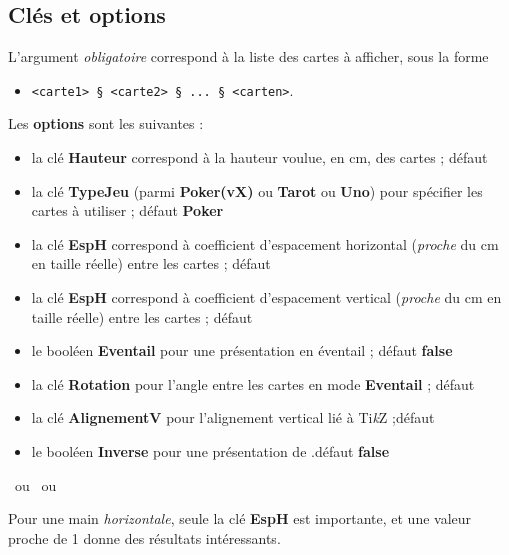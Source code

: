 \documentclass{article}
\providecommand\tikzlogo{Ti\textit{k}Z}
\let\TikZ\tikzlogo
\newcommand\Cle[1]{{\bfseries\sffamily\textlangle #1\textrangle}}
\begin{document}
{{{{{{{{{\subsection{Clés et options}

\begin{codecles}
L'argument \textit{obligatoire} correspond à la liste des cartes à afficher, sous la forme 

\begin{itemize}
	\item \texttt{<carte1> § <carte2> § ... § <carten>}.
\end{itemize}

Les \Cle{options} sont les suivantes :

\begin{itemize}
	\item la clé \Cle{Hauteur} correspond à la hauteur voulue, en cm, des cartes ; \hfill{}défaut \Cle{4.25}
	\item la clé \Cle{TypeJeu} (parmi \Cle{Poker(vX)} ou \Cle{Tarot} ou \Cle{Uno}) pour spécifier les cartes à utiliser ; \hfill{}défaut \Cle{Poker}
	\item la clé \Cle{EspH} correspond à coefficient d'espacement horizontal (\textit{proche} du cm en taille réelle) entre les cartes ; \hfill{}défaut \Cle{1}
	\item la clé \Cle{EspH} correspond à coefficient d'espacement vertical (\textit{proche} du cm en taille réelle) entre les cartes ; \hfill{}défaut \Cle{0}
	\item le booléen \Cle{Eventail} pour une présentation en éventail ; \hfill{}défaut \Cle{false}
	\item la clé \Cle{Rotation} pour l'angle entre les cartes en mode \Cle{Eventail}  ; \hfill{}défaut \Cle{10}
	\item la clé \Cle{AlignementV} pour l'alignement vertical lié à \TikZ{} ;\hfill{}défaut \Cle{0.5}
	\item le booléen \Cle{Inverse} pour une présentation de .\hfill{}défaut \Cle{false}
\end{itemize}
\end{codecles}

\begin{codetex}[]
~ou 
~ou 
\end{codetex}

\begin{codeinfo}
Pour une main \textit{horizontale}, seule la clé \Cle{EspH} est importante, et une valeur proche de 1 donne des résultats intéressants.


\end{codeinfo}}}}}}}}}}
\end{document}
